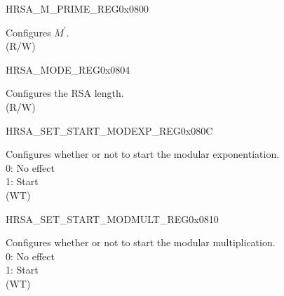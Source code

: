 \begin{register}{H}{RSA\_M\_PRIME\_REG}{0x0800}\label{regdesc:RSAMPRIMEREG}
%
\regnewline%
\begin{regdesc}\begin{reglist}
\label{fielddesc:RSAMPRIME}\item [RSA\_M\_PRIME] Configures \begin{math}M^{\prime}\end{math}. \\
(R/W)
\end{reglist}\end{regdesc}
\end{register}


\begin{register}{H}{RSA\_MODE\_REG}{0x0804}\label{regdesc:RSAMODEREG}
%
%
\regnewline%
\begin{regdesc}\begin{reglist}
\label{fielddesc:RSAMODE}\item [RSA\_MODE] Configures the RSA length. \\
(R/W)
\end{reglist}\end{regdesc}
\end{register}


\begin{register}{H}{RSA\_SET\_START\_MODEXP\_REG}{0x080C}\label{regdesc:RSASETSTARTMODEXPREG}
%
%
\regnewline%
\begin{regdesc}\begin{reglist}
\label{fielddesc:RSASETSTARTMODEXP}\item [RSA\_SET\_START\_MODEXP] Configures whether or not to start the modular exponentiation. \\
0: No effect\\
1: Start\\ 
(WT)
\end{reglist}\end{regdesc}
\end{register}


\begin{register}{H}{RSA\_SET\_START\_MODMULT\_REG}{0x0810}\label{regdesc:RSASETSTARTMODMULTREG}
%
%
\regnewline%
\begin{regdesc}\begin{reglist}
\label{fielddesc:RSASETSTARTMODMULT}\item [RSA\_SET\_START\_MODMULT] Configures whether or not to start the modular multiplication.\\
0: No effect\\
1: Start\\ (WT)
\end{reglist}\end{regdesc}
\end{register}


